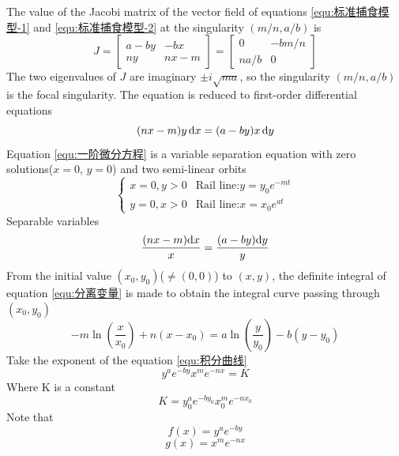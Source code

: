The value of the Jacobi matrix of the vector field of equations \eqref{equ:标准捕食模型-1} and \eqref{equ:标准捕食模型-2} at the singularity $(m/n,a/b)$ is
    \begin{equation}\label{equ:Jacobi矩阵-2}
    J = \begin{bmatrix} a-by & -bx   \\ ny    & nx-m \end{bmatrix}
      = \begin{bmatrix} 0    & -bm/n \\ na/b  & 0    \end{bmatrix}
    \end{equation}
The two eigenvalues of $J$ are imaginary $\pm i\sqrt{ma}$, so the singularity $(m/n,a/b)$ is the focal singularity.
The equation is reduced to first-order differential equations
    \begin{equation}\label{equ:一阶微分方程}
    (nx-m)y\,\mathrm{d} x = (a-by)x\,\mathrm{d} y
    \end{equation}
Equation \eqref{equ:一阶微分方程} is a variable separation equation with zero solutions($x=0$, $y=0$) and two semi-linear orbits
    \begin{equation*}
    \begin{cases}
    x=0, y>0 & \text{Rail line:} y=y_0e^{-mt} \\
    y=0, x>0 & \text{Rail line:} x=x_0e^{at}
    \end{cases}
    \end{equation*}
Separable variables
    \begin{equation}\label{equ:分离变量}
    \frac{(nx-m)\mathrm{d} x}{x} = \frac{(a-by)\mathrm{d} y}{y}
    \end{equation}
From the initial value $(x_0,y_0)$($\neq (0,0)$) to $(x,y)$, the definite integral of equation \eqref{equ:分离变量} is made to obtain the integral curve passing through $(x_0,y_0)$
    \begin{equation}\label{equ:积分曲线}
    -m\ln\left(\frac{x}{x_0}\right)+n(x-x_0) = a\ln\left(\frac{y}{y_0}\right)-b(y-y_0)
    \end{equation}
Take the exponent of the equation \eqref{equ:积分曲线}
    \begin{equation}\label{equ:积分指数1}
    y^ae^{-by}x^me^{-nx} = K
    \end{equation}
Where K is a constant
    \begin{equation}\label{equ:积分指数2}
    K=y_0^ae^{-by_0}x_0^me^{-nx_0}
    \end{equation}
Note that
    \begin{equation}\label{equ:函数f}
    f(x)=y^ae^{-by}
    \end{equation}
    \begin{equation}\label{equ:函数g}
    g(x)=x^me^{-nx}
    \end{equation}
    
